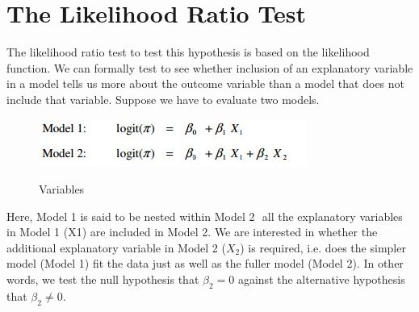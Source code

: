 ﻿\documentclass[a4paper,12pt]{article}
\begin{document}
\section{The Likelihood Ratio Test}
The likelihood ratio test to test this hypothesis is based on the likelihood
function. We can formally test to see whether inclusion of an explanatory variable in a model tells us
more about the outcome variable than a model that does not include that variable. Suppose
we have to evaluate two models. 

\begin{center}
	\begin{figure}[h!]
		\includegraphics[scale=0.6]{images/LogWeek10D}\\
		\caption{Variables}
	\end{figure}
\end{center}
Here, Model 1 is said to be nested within Model 2  all the explanatory variables in Model 1
(X1) are included in Model 2. We are interested in whether the additional explanatory
variable in Model 2 ($X_2$) is required, i.e. does the simpler model (Model 1) fit the data just as
well as the fuller model (Model 2). In other words, we test the null hypothesis that $\beta_2 = 0$
against the alternative hypothesis that $\beta_2 \neq 0$. 
\end{document}
